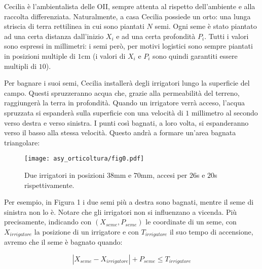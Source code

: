 \usepackage{xcolor}
\usepackage{afterpage}
\usepackage{pifont,mdframed}
\usepackage[bottom]{footmisc}



\renewcommand{\inputfile}{\texttt{stdin}}
\renewcommand{\outputfile}{\texttt{stdout}}
\makeatletter
\renewcommand{\this@inputfilename}{\texttt{stdin}}
\renewcommand{\this@outputfilename}{\texttt{stdout}}
\makeatother


Cecilia è l'ambientalista delle OII, sempre attenta al rispetto dell'ambiente e
alla raccolta differenziata. Naturalmente, a casa Cecilia possiede un orto: una
lunga striscia di terra rettilinea in cui sono piantati $N$ semi. Ogni seme è
stato piantato ad una certa distanza dall'inizio $X_i$ e ad una certa profondità
$P_i$. Tutti i valori sono espressi in millimetri: i semi però, per motivi
logistici sono sempre piantati in posizioni multiple di $1$cm (i valori di $X_i$
e $P_i$ sono quindi garantiti essere multipli di $10$).

Per bagnare i suoi semi, Cecilia installerà degli irrigatori lungo la superficie
del campo. Questi spruzzeranno acqua che, grazie alla permeabilità del terreno,
raggiungerà la terra in profondità. Quando un irrigatore verrà acceso, l'acqua
spruzzata si espanderà sulla superficie con una velocità di $1$ millimetro al
secondo verso destra e verso sinistra. I punti così bagnati, a loro volta, si
espanderanno verso il basso alla stessa velocità. Questo andrà a formare un'area
bagnata triangolare:%
%
\begin{figure}[H]
  \centering
  \texttt{[image: asy\_orticoltura/fig0.pdf]}
  \caption{Due irrigatori in posizioni $38$mm e $70$mm, accesi per $26$s e $20$s rispettivamente.}
\end{figure}

Per esempio, in Figura 1 i due semi più a destra sono bagnati, mentre il seme di sinistra non lo è. Notare che gli irrigatori non si influenzano a vicenda.
Più precisamente, indicando con $(X_{seme}, P_{seme})$ le coordinate di un seme,
con $X_{irrigatore}$ la posizione di un irrigatore e con $T_{irrigatore}$ il suo
tempo di accensione, avremo che il seme è bagnato quando:

$$|X_{seme}-X_{irrigatore}| + P_{seme} \le T_{irrigatore}$$

